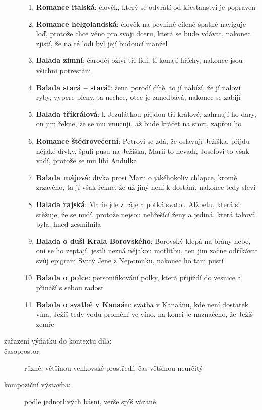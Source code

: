 \documentclass{article}
\begin{document}
\begin{description}
\begin{enumerate}
        \item \textbf{Romance italská}: člověk, který se odvrátí od křesťanství je popraven
        \item \textbf{Romance helgolandská}: člověk na pevnině cíleně špatně naviguje loď, protože chce věno pro svoji dceru, která se bude vdávat, nakonec zjistí, že na té lodi byl její budoucí manžel
        \item \textbf{Balada zimní}: čaroděj oživí tři lidi, ti konají hříchy, nakonec jsou všichni potrestáni
        \item \textbf{Balada stará -- stará!}: žena porodí dítě, to jí nabízí, že jí naloví ryby, vypere pleny, ta nechce, otec je zanedbává, nakonec se zabijí
        \item \textbf{Balada tříkrálová}: k Jezulátkou přijdou tři králové, zahrnují ho dary, on jim řekne, že se mu vnucují, až bude kráčet na smrt, zapřou ho
        \item \textbf{Romance štědrovečerní}: Petrovi se zdá, že oslavují Ježíška, přijdu nějaké dívky, špulí pusu na Ježíška, Marii to nevadí, Josefovi to však vadí, protože se mu líbí Andulka
        \item \textbf{Balada májová}: dívka prosí Marii o jakéhokoliv chlapce, kromě zrzavého, ta jí však řekne, že už jiný není k dostání, nakonec tedy sleví
        \item \textbf{Balada rajská}: Marie jde z ráje a potká svatou Alžbetu, která si stěžuje, že se nudí, protože nejsou nehřešící ženy a jediná, která taková byla, hned zesmilnila
        \item \textbf{Balada o duši Krala Borovského}: Borovský klepá na brány nebe, oni se ho zeptají, jestli nezná nějakou motlitbu, ten jim začne odříkávat svůj epigram Svatý Jene z Nepomuku, nakonec ho tam pustí
        \item \textbf{Balada o polce}: personifikování polky, která přijíždí do vesnice a přináší s sebou radost
        \item \textbf{Balada o svatbě v Kanaán}: svatba v Kanaánu, kde není dostatek vína, Ježíš tedy vodu promění ve víno, na konci je naznačeno, že Ježíš zemře
    \end{enumerate}
    \item[zařazení výňatku do kontextu díla:]
    \item[časoprostor:] různé, většinou venkovské prostředí, čas většinou neurčitý
    \item[kompoziční výstavba:] podle jednotlivých básní, verše spíš vázané
\end{description}
\end{document}
